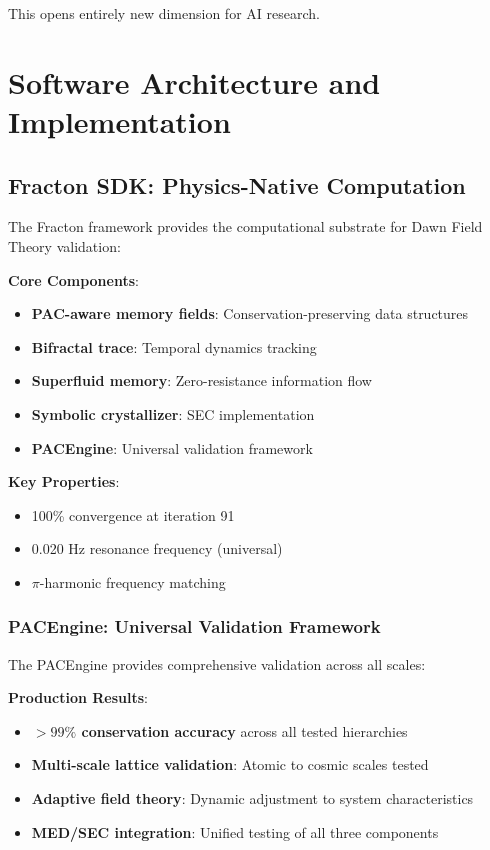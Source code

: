\documentclass[11pt,a4paper]{article}
\begin{document}
This opens entirely new dimension for AI research.

\section{Software Architecture and Implementation}

\subsection{Fracton SDK: Physics-Native Computation}

The Fracton framework provides the computational substrate for Dawn Field Theory validation:

\textbf{Core Components}:
\begin{itemize}
    \item \textbf{PAC-aware memory fields}: Conservation-preserving data structures
    \item \textbf{Bifractal trace}: Temporal dynamics tracking
    \item \textbf{Superfluid memory}: Zero-resistance information flow
    \item \textbf{Symbolic crystallizer}: SEC implementation
    \item \textbf{PACEngine}: Universal validation framework
\end{itemize}

\textbf{Key Properties}:
\begin{itemize}
    \item 100\% convergence at iteration 91
    \item 0.020 Hz resonance frequency (universal)
    \item $\pi$-harmonic frequency matching
\end{itemize}

\subsubsection{PACEngine: Universal Validation Framework}

The PACEngine provides comprehensive validation across all scales:

\textbf{Production Results}:
\begin{itemize}
    \item \textbf{$>99\%$ conservation accuracy} across all tested hierarchies
    \item \textbf{Multi-scale lattice validation}: Atomic to cosmic scales tested
    \item \textbf{Adaptive field theory}: Dynamic adjustment to system characteristics
    \item \textbf{MED/SEC integration}: Unified testing of all three components
\end{itemize}
\end{document}
